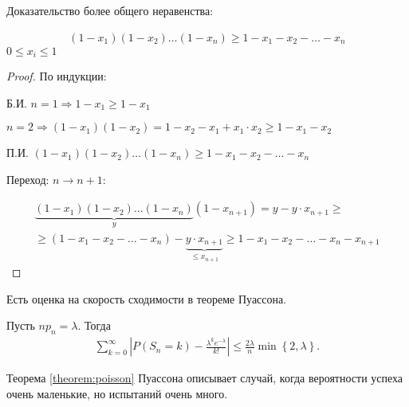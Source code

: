 \begin{remrk*}
	Доказательство более общего неравенства:

	\begin{align*}
		(1 - x_1)(1 - x_2) \ldots (1-x_n) \geqslant 1 - x_1 - x_2 - \ldots - x_n
	\end{align*}$0 \leq x_i \leq 1$

\end{remrk*}

\begin{proof}
	По индукции:

	Б.И. $n = 1 \Rightarrow 1 - x_1 \geq 1 - x_1$ 

	$n = 2 \Rightarrow (1 - x_1)(1 - x_2) = 1 - x_2 - x_1 + x_1 \cdot x_2 \geq 1 - x_1 - x_2$

	П.И. $(1 - x_1)(1 - x_2) \dots (1 - x_n) \geq 1 - x_1 - x_2 - \dots - x_n$

	Переход: $n \to n + 1$:

	\begin{align*}
		\underbrace{(1 - x_1)(1 - x_2) \dots (1 - x_n)}_{y}(1-x_{n + 1}) = y - y \cdot x_{n+1} \geq \\ \geq(1 - x_1 - x_2 - \dots - x_n) - \underbrace{y \cdot x_{n + 1}}_{\leq x_{n + 1}} \geq 1 - x_1 - x_2 - \dots - x_n - x_{n + 1}
	\end{align*}
\end{proof}

Есть оценка на скорость сходимости в теореме Пуассона.

\begin{thm}[%
 Прохорова]
 Пусть $np_n = \lambda$. Тогда
 \begin{align*}
  \sum_{k=0}^{\infty} \left| P(S_n = k) - \frac{\lambda^{k}e^{-\lambda}}{k!}\right| \leqslant \frac{2\lambda}{n} \min \left\{ 2, \lambda \right\}.
 \end{align*} 
\end{thm}

Теорема \ref{theorem:poisson} Пуассона описывает случай, когда вероятности успеха очень маленькие, но испытаний очень много.

